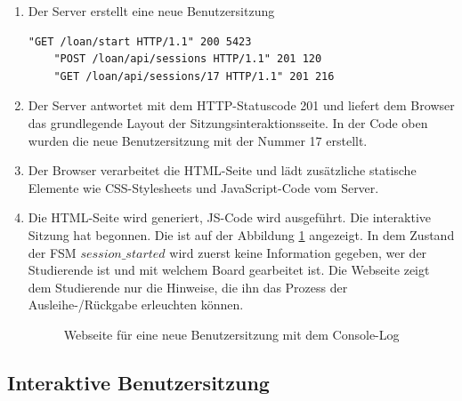 \begin{enumerate}
	\item Der Server erstellt eine neue Benutzersitzung
	\begin{lstlisting}[caption={[HTTP-Statuscodes für die neue Sitzung] },captionpos=b]
	"GET /loan/start HTTP/1.1" 200 5423
	"POST /loan/api/sessions HTTP/1.1" 201 120
	"GET /loan/api/sessions/17 HTTP/1.1" 201 216
	\end{lstlisting}
\item Der Server antwortet mit dem HTTP-Statuscode 201 und liefert dem Browser das grundlegende Layout der Sitzungsinteraktionsseite. In der Code oben wurden die neue Benutzersitzung mit der Nummer 17 erstellt.
\item Der Browser verarbeitet die HTML-Seite und lädt zusätzliche statische Elemente wie CSS-Stylesheets und JavaScript-Code vom Server.
\item Die HTML-Seite wird generiert, JS-Code wird ausgeführt. Die interaktive Sitzung hat begonnen. Die ist auf der Abbildung \ref{fig:web01} angezeigt. In dem Zustand der FSM $session\_started$ wird zuerst keine Information gegeben, wer der Studierende ist und mit welchem Board gearbeitet ist. Die Webseite zeigt dem Studierende nur die Hinweise, die ihn das Prozess der Ausleihe-/Rückgabe erleuchten können. 
\begin{figure}[h!]
	\centering
	\caption{Webseite für eine neue Benutzersitzung mit dem Console-Log}
	\label{fig:web01}
\end{figure}
\end{enumerate}

\subsection{Interaktive Benutzersitzung}
\label{sec:display_client:session}

